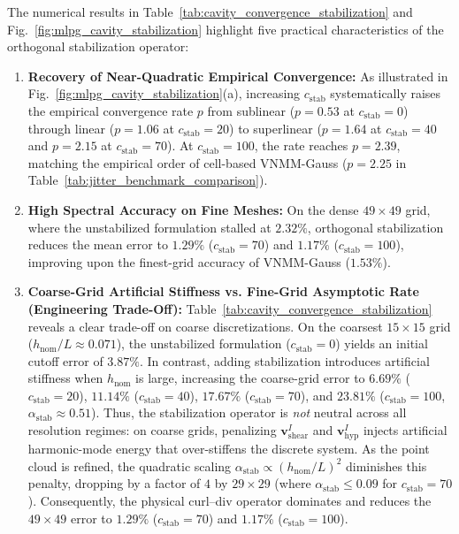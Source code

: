 \documentclass[VANCOUVER,Times1COL]{WileyNJD-v5}
\begin{document}
The numerical results in Table~\ref{tab:cavity_convergence_stabilization} and Fig.~\ref{fig:mlpg_cavity_stabilization} highlight five practical characteristics of the orthogonal stabilization operator:
\begin{enumerate}
    \item \textbf{Recovery of Near-Quadratic Empirical Convergence:} As illustrated in Fig.~\ref{fig:mlpg_cavity_stabilization}(a), increasing $c_{\mathrm{stab}}$ systematically raises the empirical convergence rate $p$ from sublinear ($p = 0.53$ at $c_{\mathrm{stab}} = 0$) through linear ($p = 1.06$ at $c_{\mathrm{stab}} = 20$) to superlinear ($p = 1.64$ at $c_{\mathrm{stab}} = 40$ and $p = 2.15$ at $c_{\mathrm{stab}} = 70$). At $c_{\mathrm{stab}} = 100$, the rate reaches $p = 2.39$, matching the empirical order of cell-based VNMM-Gauss ($p = 2.25$ in Table~\ref{tab:jitter_benchmark_comparison}).
    \item \textbf{High Spectral Accuracy on Fine Meshes:} On the dense $49 \times 49$ grid, where the unstabilized formulation stalled at $2.32\%$, orthogonal stabilization reduces the mean error to $1.29\%$ ($c_{\mathrm{stab}} = 70$) and $\mathbf{1.17\%}$ ($c_{\mathrm{stab}} = 100$), improving upon the finest-grid accuracy of VNMM-Gauss ($1.53\%$).
    \item \textbf{Coarse-Grid Artificial Stiffness vs. Fine-Grid Asymptotic Rate (Engineering Trade-Off):} Table~\ref{tab:cavity_convergence_stabilization} reveals a clear trade-off on coarse discretizations. On the coarsest $15 \times 15$ grid ($h_{\mathrm{nom}}/L \approx 0.071$), the unstabilized formulation ($c_{\mathrm{stab}} = 0$) yields an initial cutoff error of $3.87\%$. In contrast, adding stabilization introduces artificial stiffness when $h_{\mathrm{nom}}$ is large, increasing the coarse-grid error to $6.69\%$ ($c_{\mathrm{stab}} = 20$), $11.14\%$ ($c_{\mathrm{stab}} = 40$), $17.67\%$ ($c_{\mathrm{stab}} = 70$), and $23.81\%$ ($c_{\mathrm{stab}} = 100$, $\alpha_{\mathrm{stab}} \approx 0.51$).
    Thus, the stabilization operator is \emph{not} neutral across all resolution regimes: on coarse grids, penalizing $\mathbf{v}_{\mathrm{shear}}^I$ and $\mathbf{v}_{\mathrm{hyp}}^I$ injects artificial harmonic-mode energy that over-stiffens the discrete system.
    As the point cloud is refined, the quadratic scaling $\alpha_{\mathrm{stab}} \propto (h_{\mathrm{nom}}/L)^2$ diminishes this penalty, dropping by a factor of $4$ by $29 \times 29$ (where $\alpha_{\mathrm{stab}} \le 0.09$ for $c_{\mathrm{stab}} = 70$). Consequently, the physical curl--div operator dominates and reduces the $49 \times 49$ error to $1.29\%$ ($c_{\mathrm{stab}} = 70$) and $1.17\%$ ($c_{\mathrm{stab}} = 100$).

\end{enumerate}
\end{document}
